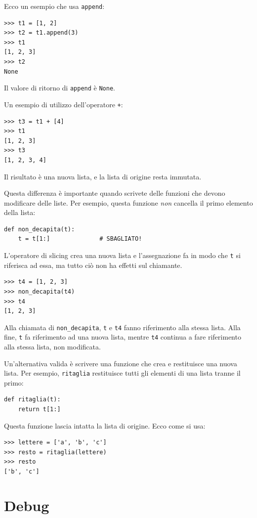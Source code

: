 \documentclass[10pt]{book}
\begin{document}
Ecco un esempio che usa {\tt append}:
%
\begin{verbatim}
>>> t1 = [1, 2]
>>> t2 = t1.append(3)
>>> t1
[1, 2, 3]
>>> t2
None
\end{verbatim}
%
Il valore di ritorno di {\tt append} è {\tt None}.

Un esempio di utilizzo dell'operatore {\tt +}:
%
\begin{verbatim}
>>> t3 = t1 + [4]
>>> t1
[1, 2, 3]
>>> t3
[1, 2, 3, 4]
\end{verbatim}
%
Il risultato è una nuova lista, e la lista di origine resta immutata.

Questa differenza è importante quando scrivete delle funzioni che devono modificare delle liste. Per esempio, questa funzione
{\em non} cancella il primo elemento della lista:
%
\begin{verbatim}
def non_decapita(t):
    t = t[1:]              # SBAGLIATO!
\end{verbatim}
%
L'operatore di slicing crea una nuova lista e l'assegnazione fa in modo che {\tt t} si riferisca ad essa, ma tutto ciò non ha effetti sul chiamante.
%
\begin{verbatim}
>>> t4 = [1, 2, 3]
>>> non_decapita(t4)
>>> t4
[1, 2, 3]
\end{verbatim}
%
Alla chiamata di \verb"non_decapita", {\tt t} e {\tt t4} fanno riferimento
alla stessa lista.  Alla fine, {\tt t} fa riferimento ad una nuova lista,
mentre {\tt t4} continua a fare riferimento alla stessa lista, non modificata.

Un'alternativa valida è scrivere una funzione che crea e restituisce una nuova lista. Per esempio, {\tt ritaglia} restituisce tutti gli elementi di una lista tranne il primo:

\begin{verbatim}
def ritaglia(t):
    return t[1:]
\end{verbatim}
%
Questa funzione lascia intatta la lista di origine. Ecco come si usa:

\begin{verbatim}
>>> lettere = ['a', 'b', 'c']
>>> resto = ritaglia(lettere)
>>> resto
['b', 'c']
\end{verbatim}



\section{Debug}
\end{document}
